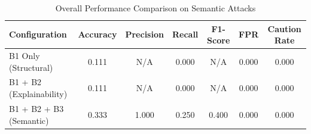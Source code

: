 \begin{table}[h]
\centering
\caption{Overall Performance Comparison on Semantic Attacks}
\label{tab:semantic_results}
\begin{tabular}{lcccccc}
\hline
\textbf{Configuration} & \textbf{Accuracy} & \textbf{Precision} & \textbf{Recall} & \textbf{F1-Score} & \textbf{FPR} & \textbf{Caution Rate} \\ \hline
B1 Only (Structural) & 0.111 & N/A & 0.000 & N/A & 0.000 & 0.000 \\
B1 + B2 (Explainability) & 0.111 & N/A & 0.000 & N/A & 0.000 & 0.000 \\
B1 + B2 + B3 (Semantic) & 0.333 & 1.000 & 0.250 & 0.400 & 0.000 & 0.000 \\
\hline
\end{tabular}
\end{table}
